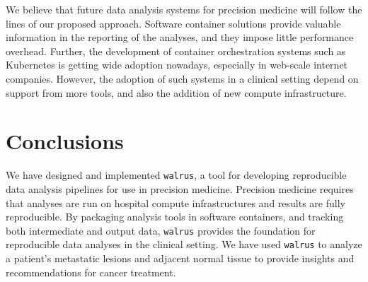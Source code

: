 We believe that future data analysis systems for precision medicine will follow
the lines of our proposed approach. Software container solutions provide
valuable information in the reporting of the analyses, and they impose little
performance overhead. Further, the development of container orchestration
systems such as Kubernetes is getting wide adoption nowadays, especially in
web-scale internet companies. However, the adoption of such systems in a
clinical setting depend on support from more tools, and also the addition
of new compute infrastructure. 

\section{Conclusions} 
We have designed and implemented \texttt{walrus}, a tool for developing 
reproducible data analysis pipelines for use in precision medicine. Precision
medicine requires that analyses are run on hospital compute infrastructures and
results are fully reproducible. By packaging analysis tools in software
containers, and tracking both intermediate and output data, \texttt{walrus}
provides the foundation for reproducible data analyses in the clinical setting.
We have used \texttt{walrus} to analyze a patient's metastatic lesions and
adjacent normal tissue to provide insights and recommendations for  cancer
treatment. 
